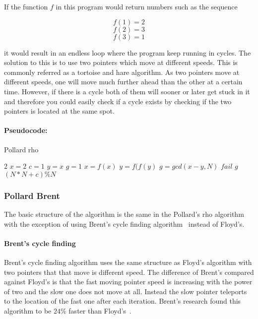 If the function \(f\) in this program would return numbers such as the sequence

\[f(1) = 2\] 
\[f(2) = 3\] 
\[f(3) = 1\]

it would result in an endless loop where the program keep running in cycles. The solution to this is to use two pointers which move at different speeds. This is commonly referred as a tortoise and hare algorithm. 
As two pointers move at different speeds, one will move much further ahead than the other at a certain time. However, if there is a cycle both of them will sooner or later get stuck in it and therefore you could easily check if a cycle exists by checking if the two pointers is located at the same spot.

\paragraph{Pseudocode:}

\textcolor{white}{ }

\begin{algorithm}[H]
\caption{Pollard rho}
\begin{algorithmic}
	 	\State \Return $2$
	\EndIf
	\State $x = 2$
	\State $c = 1$
	\State $y = x$
	\State $g = 1$
		\State $x = f(x)$
		\State $y = f(f(y)$
		\State $g = gcd(x-y,N)$
	\EndWhile
		\State \Return $fail$
	\EndIf
	\State \Return $g$	
\EndFunction
{}
	\State \Return $(N*N + c) \% N$
\EndFunction
\end{algorithmic}
\end{algorithm}

\subsubsection{Pollard Brent}

The basic structure of the algorithm is the same in the Pollard's rho algorithm with the exception of using Brent's cycle finding algorithm~\cite{brent} instead of Floyd's.

\paragraph{Brent's cycle finding}

Brent's cycle finding algorithm uses the same structure as Floyd's algorithm with two pointers that that move is different speed. The difference of Brent's compared against Floyd's is that the fast moving pointer speed is increasing with the power of two and the slow one does not move at all. Instead the slow pointer teleports to the location of the fast one after each iteration.
Brent's research found this algorithm to be $24\%$ faster than Floyd's~\cite{brent}.

